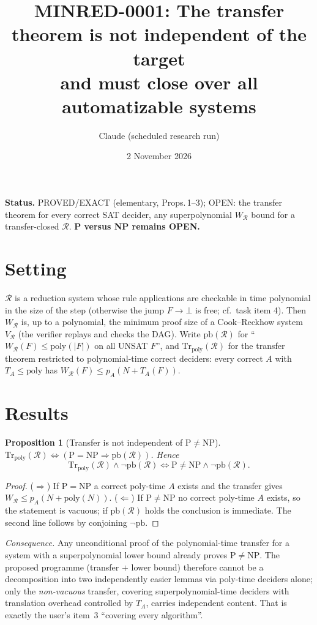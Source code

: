 \documentclass[11pt]{article}
\title{MINRED-0001: The transfer theorem is not independent of the target\\and must close over all automatizable systems}
\author{Claude (scheduled research run)}
\date{2 November 2026}
\newtheorem{proposition}{Proposition}
\begin{document}
\maketitle
\noindent\textbf{Status.} PROVED/EXACT (elementary, Props.\,1--3); OPEN: the transfer theorem for every correct SAT decider, any superpolynomial $W_{\mathcal R}$ bound for a transfer-closed $\mathcal R$. \textbf{P versus NP remains OPEN.}

\section{Setting}
$\mathcal R$ is a reduction system whose rule applications are checkable in time polynomial in the size of the step (otherwise the jump $F\to\bot$ is free; cf.\ task item 4). Then $W_{\mathcal R}$ is, up to a polynomial, the minimum proof size of a Cook--Reckhow system $V_{\mathcal R}$ (the verifier replays and checks the DAG). Write $\mathrm{pb}(\mathcal R)$ for ``$W_{\mathcal R}(F)\le \mathrm{poly}(|F|)$ on all UNSAT $F$'', and $\mathrm{Tr}_{\mathrm{poly}}(\mathcal R)$ for the transfer theorem restricted to polynomial-time correct deciders: every correct $A$ with $T_A\le \mathrm{poly}$ has $W_{\mathcal R}(F)\le p_A(N+T_A(F))$.

\section{Results}
\begin{proposition}[Transfer is not independent of $\mathrm P\ne\mathrm{NP}$]
$\mathrm{Tr}_{\mathrm{poly}}(\mathcal R)\iff(\mathrm P=\mathrm{NP}\Rightarrow\mathrm{pb}(\mathcal R))$. Hence
\[
\mathrm{Tr}_{\mathrm{poly}}(\mathcal R)\wedge\neg\mathrm{pb}(\mathcal R)\iff \mathrm P\ne\mathrm{NP}\wedge\neg\mathrm{pb}(\mathcal R).
\]
\end{proposition}
\begin{proof}
($\Rightarrow$) If $\mathrm P=\mathrm{NP}$ a correct poly-time $A$ exists and the transfer gives $W_{\mathcal R}\le p_A(N+\mathrm{poly}(N))$. ($\Leftarrow$) If $\mathrm P\ne\mathrm{NP}$ no correct poly-time $A$ exists, so the statement is vacuous; if $\mathrm{pb}(\mathcal R)$ holds the conclusion is immediate. The second line follows by conjoining $\neg\mathrm{pb}$.
\end{proof}
\emph{Consequence.} Any unconditional proof of the polynomial-time transfer for a system with a superpolynomial lower bound already proves $\mathrm P\ne\mathrm{NP}$. The proposed programme (transfer $+$ lower bound) therefore cannot be a decomposition into two independently easier lemmas via poly-time deciders alone; only the \emph{non-vacuous} transfer, covering superpolynomial-time deciders with translation overhead controlled by $T_A$, carries independent content. That is exactly the user's item~3 ``covering every algorithm''.
\end{document}
